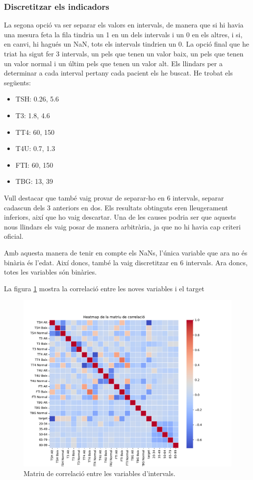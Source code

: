 \documentclass[9pt,a4paper,twoside]{tau-class/tau}
\begin{document}
    \subsubsection{Discretitzar els indicadors}
    La segona opció va ser separar els valors en intervals, de manera que si hi havia una mesura feta la fila tindria un 1 en un dels intervals i un 0 en els altres, i si, en canvi, hi hagués un NaN, tots els intervals tindrien un 0. La opció final que he triat ha sigut fer 3 intervals, un pels que tenen un valor baix, un pels que tenen un valor normal i un últim pels que tenen un valor alt. Els llindars per a determinar a cada interval pertany cada pacient els he buscat. He trobat els següents:
    \begin{itemize}
        \item TSH: 0.26, 5.6
        \item T3: 1.8, 4.6
        \item TT4: 60, 150
        \item T4U: 0.7, 1.3
        \item FTI: 60, 150
        \item TBG: 13, 39
    \end{itemize}

    Vull destacar que també vaig provar de separar-ho en 6 intervals, separar cadascun dels 3 anteriors en dos. Els resultats obtinguts eren lleugerament inferiors, així que ho vaig descartar. Una de les causes podria ser que aquests nous llindars els vaig posar de manera arbitrària, ja que no hi havia cap criteri oficial.

    Amb aquesta manera de tenir en compte els NaNs, l'única variable que ara no és binària és l'edat. Així doncs, també la vaig discretitzar en 6 intervals. Ara doncs, totes les variables són binàries.

    La figura \ref{fig:figure5} mostra la correlació entre les noves variables i el target
    \begin{figure}[H]
		\centering
		\includegraphics[width=0.75\columnwidth]{correlation_matrix_atributs_df_intervals.pdf}
		\caption{Matriu de correlació entre les variables d'intervals.}
		\label{fig:figure5}
	\end{figure}
\end{document}
